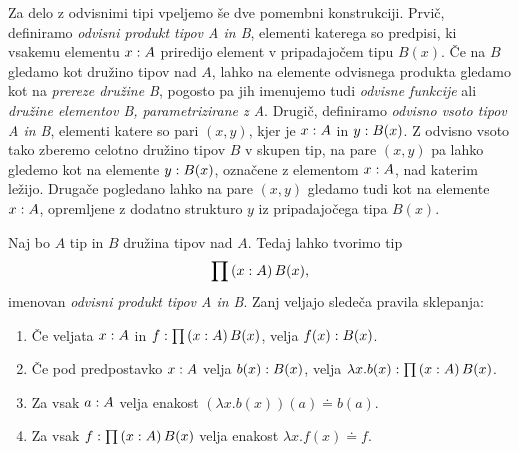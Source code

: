 Za delo z odvisnimi tipi vpeljemo še dve pomembni konstrukciji. Prvič, definiramo
\emph{odvisni produkt tipov A in B}, elementi katerega so predpisi, ki vsakemu elementu
\(x : A\) priredijo element v pripadajočem tipu \(B(x)\).
Če na \(B\) gledamo kot družino tipov
nad \(A\), lahko na elemente odvisnega produkta gledamo kot na \emph{prereze družine B},
pogosto pa jih imenujemo tudi \emph{odvisne funkcije} ali \emph{družine elementov B,
parametrizirane z A}. Drugič, definiramo \emph{odvisno vsoto tipov A in B}, elementi
katere so pari \((x, y)\), kjer je \(x : A\) in \(y : B(x)\).
Z odvisno vsoto tako zberemo celotno družino tipov \(B\) v skupen tip,
na pare \((x, y)\) pa lahko gledemo kot na elemente \(y : B(x)\), označene z
elementom \(x : A\), nad katerim ležijo.
Drugače pogledano lahko na pare \((x, y)\) gledamo tudi kot na elemente
\(x : A\), opremljene z dodatno strukturo \(y\) iz
pripadajočega tipa \(B(x)\).

\begin{definicija}
  Naj bo \(A\) tip in \(B\) družina tipov nad \(A\). Tedaj lahko tvorimo tip
  \[\prod \left( x : A \right) B(x),\] imenovan \emph{odvisni produkt tipov A in B}.
  Zanj veljajo sledeča pravila sklepanja:
  \begin{enumerate}
  \item Če veljata \(x : A\) in
    \(f : \prod \left( x : A \right) B(x)\), velja
    \(f(x) : B(x)\).
  \item Če pod predpostavko \(x : A\) velja \(b(x) : B(x)\),
    velja \(\lambda x.b(x) : \prod \left( x : A \right) B(x)\).
  \item Za vsak \(a : A\) velja enakost \((\lambda x.b(x))(a) \doteq b(a)\).
  \item Za vsak \(f : \prod \left( x : A \right) B(x)\) velja enakost \(\lambda x.f(x) \doteq f\).
  \end{enumerate}
\end{definicija}

